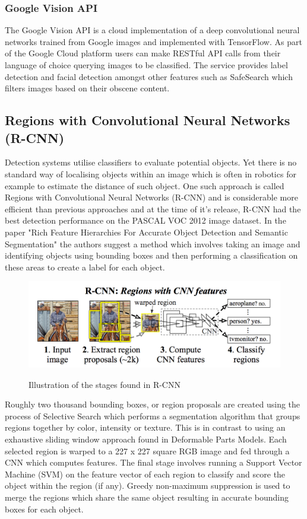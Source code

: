 \documentclass{mproj}
\begin{document}
  \subsubsection{Google Vision API}
  
The Google Vision API is a cloud implementation of a deep convolutional neural networks trained from Google images and implemented with TensorFlow. As part of the Google Cloud platform users can make RESTful API calls from their language of choice querying images to be classified. The service provides label detection and facial detection amongst other features such as SafeSearch which filters images based on their obscene content\cite{googlevision}.

\subsection{Regions with Convolutional Neural Networks (R-CNN)}

Detection systems utilise classifiers to evaluate potential objects. Yet there is no standard way of localising objects within an image which is often in robotics for example to estimate the distance of such object. One such approach is called Regions with Convolutional Neural Networks (R-CNN) and is considerable more efficient than previous approaches and at the time of it's release, R-CNN had the best detection performance on the PASCAL VOC 2012 image dataset. In the paper "Rich Feature Hierarchies For Accurate Object Detection and Semantic Segmentation"\cite{Girshick2014} the authors suggest a method which involves taking an image and identifying objects using bounding boxes and then performing a classification on these areas to create a label for each object. 

\begin{figure}[h]
  \caption{Illustration of the stages found in R-CNN}
  \centering
  \includegraphics[width=1.0\textwidth]{images/RCNN.png}
  \label{fig:RCNN Diagram}
\end{figure}

Roughly two thousand bounding boxes, or region proposals are created using the process of Selective Search which performs a segmentation algorithm that groups regions together by color, intensity or texture.\cite{Sande2013} This is in contrast to using an exhaustive sliding window approach found in Deformable Parts Models.\cite{voc-release4} Each selected region is warped to a 227 x 227 square RGB image and fed through a CNN which computes features. The final stage involves running a Support Vector Machine (SVM) on the feature vector of each region to classify and score the object within the region (if any). Greedy non-maximum suppression is used to merge the regions which share the same object resulting in accurate bounding boxes for each object. 
\end{document}
